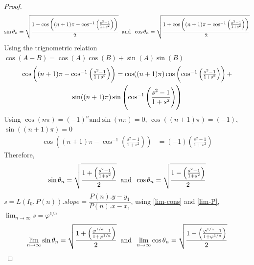 \documentclass[preprint,12pt]{elsarticle}
\begin{document}
\begin{proof}
	$$\sin\theta_n = \sqrt{\dfrac{1 - \cos\left((n+1)\pi - \cos^{-1}\left(\frac{s^2-1}{1+s^2}\right)\right)}{2}}\hspace{2mm}\text{and}\hspace{2mm}\cos\theta_n = \sqrt{\dfrac{1 + \cos\left((n+1)\pi - \cos^{-1}\left(\frac{s^2-1}{1+s^2}\right)\right)}{2}}$$
	Using the trignometric relation $\cos(A-B) = \cos(A)\cos(B)+\sin(A)\sin(B)$
	\begin{multline*}
	$$\cos\left((n+1)\pi - \cos^{-1}\left(\frac{s^2-1}{1+s^2}\right)\right)=\cos((n+1)\pi)\cos\left(\cos^{-1}\left(\frac{s^2-1}{1+s^2}\right)\right)+\\ \sin((n+1)\pi)\sin\left(\cos^{-1}\left(\frac{s^2-1}{1+s^2}\right)\right)$$
	\end{multline*}
	Using $\cos(n\pi) = (-1)^n\text{and}\sin(n\pi) = 0$, $\cos((n+1)\pi) = (-1)$, $\sin((n+1)\pi) = 0$
	\begin{align*}
	\cos\left((n+1)\pi - \cos^{-1}\left(\frac{s^2-1}{1+s^2}\right)\right) &= (-1)\left(\frac{s^2-1}{1+s^2}\right)
	\end{align*}
	Therefore, $$\sin\theta_n = \sqrt{\dfrac{1 + \left(\frac{s^2-1}{1+s^2}\right)}{2}}\hspace{2mm}\text{and}\hspace{2mm}\cos\theta_n = \sqrt{\dfrac{1 - \left(\frac{s^2-1}{1+s^2}\right)}{2}}$$
	$s = L(I_0, P(n)).slope = \dfrac{P(n).y - y_1}{P(n).x - x_1}$, using \ref{lim-cons} and \ref{lim-P}, $\lim_{n \to \infty} s = \varphi^{1/a}$
	$$\lim_{n \to \infty}\sin\theta_n = \sqrt{\dfrac{1 + \left(\frac{\varphi^{1/a}-1}{1+\varphi^{1/a}}\right)}{2}}\hspace{2mm}\text{and}\hspace{2mm}\lim_{n \to \infty}\cos\theta_n = \sqrt{\dfrac{1 - \left(\frac{\varphi^{1/a}-1}{1+\varphi^{1/a}}\right)}{2}}$$
	

\end{proof}
\end{document}
